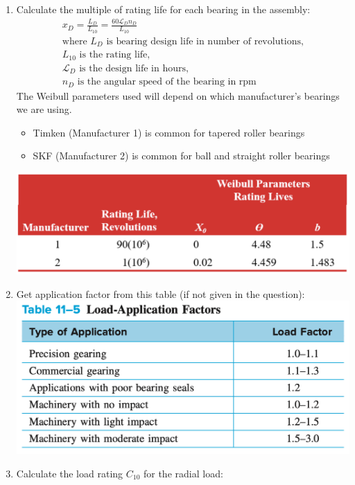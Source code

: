 \documentclass[11pt, fleqn]{article}
\begin{document}
\begin{enumerate}
    \item Calculate the multiple of rating life for each bearing in the assembly:
    \begin{align*}
        x_D = \frac{L_D}{L_{10}} = \frac{60\mathscr{L}_Dn_D}{L_{10}}\\
        \text{where $L_D$ is bearing design life in number of revolutions,}\\
        \text{$L_{10}$ is the rating life,}\\
        \text{$\mathscr{L}_D$ is the design life in hours,}\\
        \text{$n_D$ is the angular speed of the bearing in rpm}
    \end{align*}
    The Weibull parameters used will depend on which manufacturer's bearings we are using. 
    \begin{itemize}
        \item Timken (Manufacturer 1) is common for tapered roller bearings
        \item SKF (Manufacturer 2) is common for ball and straight roller bearings
    \end{itemize}
    \includegraphics[scale=0.35]{Bearings/weibull-parameters.png}
    \item Get application factor from this table (if not given in the question):\\
    \includegraphics[scale=0.5]{Bearings/application-factor.png}
    \item Calculate the load rating $C_{10}$ for the radial load:
    \begin{align*}

\end{align*}
\end{enumerate}
\end{document}
